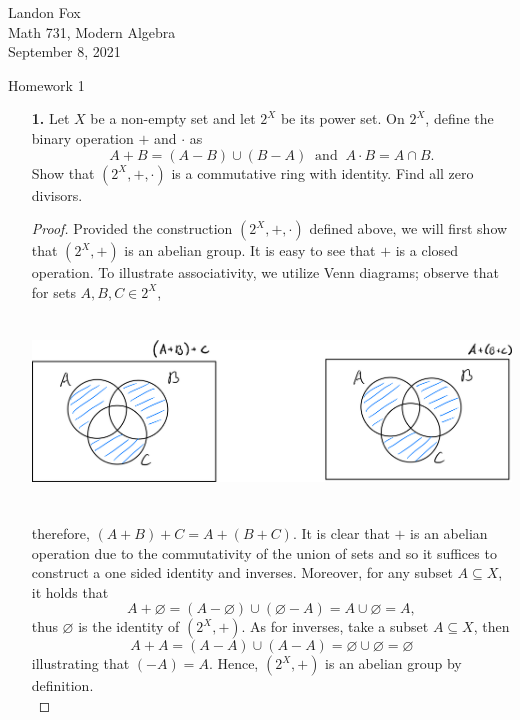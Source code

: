 \documentclass[ 12pt ]{article}
\begin{document}
\noindent Landon Fox \\
\noindent Math 731, Modern Algebra \\
\noindent September 8, 2021

\begin{center}
\Large Homework 1
\end{center}

\begin{enumerate}
	\item[\textbf{1.}] Let $X$ be a non-empty set and let $2^X$ be its power set. On $2^X$, define the binary operation $+$ and $\cdot$ as $$A + B = (A - B) \cup (B - A)\;\; \mathrm{and}\;\; A \cdot B = A \cap B.$$ Show that $(2^X, +, \cdot)$ is a commutative ring with identity. Find all zero divisors.

		\begin{proof}
			Provided the construction $(2^X, +, \cdot)$ defined above, we will first show that $(2^X, +)$ is an abelian group. It is easy to see that $+$ is a closed operation. To illustrate associativity, we utilize Venn diagrams; observe that for sets $A, B, C \in 2^X$,
			\begin{center}
				\includegraphics[width=17cm, height=5cm]{File_000}
			\end{center}
			therefore, $(A + B) + C = A + (B + C)$. It is clear that $+$ is an abelian operation due to the commutativity of the union of sets and so it suffices to construct a one sided identity and inverses. Moreover, for any subset $A \subseteq X$, it holds that $$A + \varnothing = (A - \varnothing) \cup (\varnothing - A) = A \cup \varnothing = A,$$ thus $\varnothing$ is the identity of $(2^X, +)$. As for inverses, take a subset $A \subseteq X$, then $$A + A = (A - A) \cup (A - A) = \varnothing \cup \varnothing = \varnothing$$ illustrating that $(-A) = A$. Hence, $(2^X, +)$ is an abelian group by definition. \\


\end{proof}
\end{enumerate}
\end{document}
